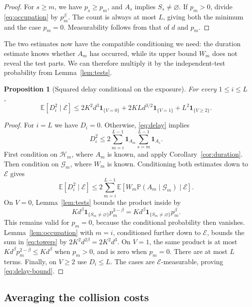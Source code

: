 \documentclass[11pt]{article}
\newtheorem{proposition}[theorem]{Proposition}
\theoremstyle{remark}
\newcommand{\Prb}{\mathbb P}
\newcommand{\E}{\mathbb E}
\newcommand{\ind}{\mathbf 1}
\newcommand{\cE}{\mathcal E}
\newcommand{\cG}{\mathcal G}
\newcommand{\cH}{\mathcal H}
\numberwithin{equation}{section}
\begin{document}
\begin{proof}
For $s\ge m$, we have $p_s\ge p_m$, and $A_s$ implies
$S_s\ne\varnothing$. If $p_m>0$, divide \eqref{eq:occupation} by
$p_m^\beta$. The count is always at most $L$, giving both the minimum
and the case $p_m=0$. Measurability follows from that of $d$ and $p_m$.
\end{proof}

The two estimates now have the compatible conditioning we need:
the duration estimate knows whether $A_m$ has occurred, while its
upper bound $W_m$ does not reveal the test parts. We can therefore
multiply it by the independent-test probability from
Lemma~\ref{lem:tests}.

\begin{proposition}[Squared delay conditional on the exposure]
\label{prop:delay}
For every $1\le i\le L$,
\begin{equation}
 \E[D_i^2\mid\cE]
 \le 2K^2d^3\ind_{\{V=0\}}
       +2KLd^{3/2}\ind_{\{V=1\}}
       +L^2\ind_{\{V\ge2\}}.
 \label{eq:delay-bound}
\end{equation}
\end{proposition}

\begin{proof}
For $i=L$ we have $D_i=0$. Otherwise, \eqref{eq:delay} implies
\[
 D_i^2\le2\sum_{m=i}^{L-1}\ind_{A_m}
                         \sum_{s=m}^{L-1}\ind_{A_s}.
\]
First condition on $\cH_m$, where $A_m$ is known, and apply
Corollary~\ref{cor:duration}. Then condition on $\cG_m$, where $W_m$
is known. Conditioning both estimates down to $\cE$ gives
\begin{equation}
 \E[D_i^2\mid\cE]
 \le2\sum_{m=i}^{L-1}
     \E[W_m\Prb(A_m\mid\cG_m)\mid\cE].
 \label{eq:towers}
\end{equation}
On $V=0$, Lemma~\ref{lem:tests} bounds the product inside by
\[
 Kd^\beta\ind_{\{S_m\ne\varnothing\}}p_m^{3-\beta}
   =Kd^\beta\ind_{\{S_m\ne\varnothing\}}p_m^\beta.
\]
This remains valid for $p_m=0$, because the conditional probability
then vanishes. Lemma~\ref{lem:occupation} with $m=i$, conditioned
further down to $\cE$, bounds the sum in \eqref{eq:towers} by
$2K^2d^{2\beta}=2K^2d^3$.
On $V=1$, the same product is at most
$Kd^\beta p_m^{2-\beta}\le Kd^\beta$ when $p_m>0$, and is zero
when $p_m=0$. There are at most $L$ terms. Finally, on $V\ge2$ use
$D_i\le L$. The cases are $\cE$-measurable, proving
\eqref{eq:delay-bound}.
\end{proof}

\subsection{Averaging the collision costs}
\end{document}
